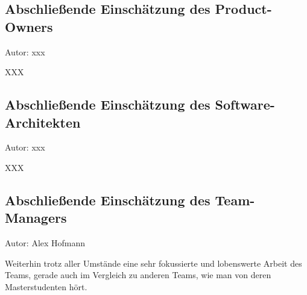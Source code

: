 \subsection{Abschließende Einschätzung des Product-Owners}
{\small Autor: xxx}

XXX

\subsection{Abschließende Einschätzung des Software-Architekten}
{\small Autor: xxx}

XXX

\subsection{Abschließende Einschätzung des Team-Managers}
{\small Autor: Alex Hofmann}

Weiterhin trotz aller Umstände eine sehr fokussierte und lobenswerte Arbeit des Teams, gerade auch im Vergleich zu anderen Teams, wie man von deren Masterstudenten hört.

